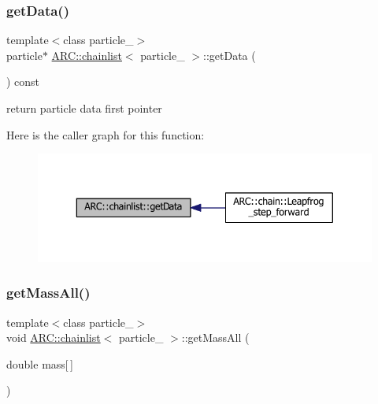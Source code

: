 \subsubsection{\texorpdfstring{get\+Data()}{getData()}}
{\footnotesize\ttfamily template$<$class particle\+\_\+$>$ \\
particle$\ast$ \hyperlink{classARC_1_1chainlist}{A\+R\+C\+::chainlist}$<$ particle\+\_\+ $>$\+::get\+Data (\begin{DoxyParamCaption}{ }\end{DoxyParamCaption}) const\hspace{0.3cm}{\ttfamily [inline]}}



return particle data first pointer 

Here is the caller graph for this function\+:
\nopagebreak
\begin{figure}[H]
\begin{center}
\leavevmode
\includegraphics[width=343pt]{classARC_1_1chainlist_a0e19bd06e5aa685e88948c947cd06552_icgraph}
\end{center}
\end{figure}
\hypertarget{classARC_1_1chainlist_a85bba1921256d2a1a6784006927ad397}{}\label{classARC_1_1chainlist_a85bba1921256d2a1a6784006927ad397} 
\subsubsection{\texorpdfstring{get\+Mass\+All()}{getMassAll()}}
{\footnotesize\ttfamily template$<$class particle\+\_\+$>$ \\
void \hyperlink{classARC_1_1chainlist}{A\+R\+C\+::chainlist}$<$ particle\+\_\+ $>$\+::get\+Mass\+All (\begin{DoxyParamCaption}\item[{double}]{mass\mbox{[}$\,$\mbox{]} }\end{DoxyParamCaption})\hspace{0.3cm}{\ttfamily [inline]}}



